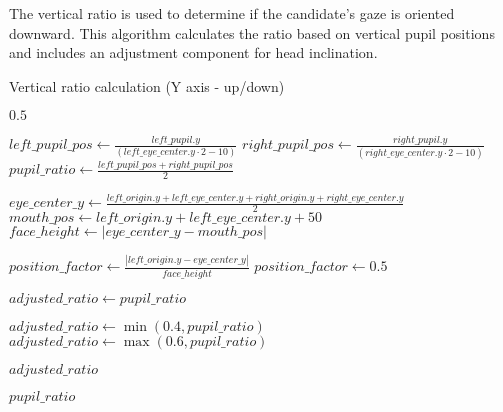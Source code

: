 \documentclass[12pt,a4paper]{article}
\begin{document}
The vertical ratio is used to determine if the candidate's gaze is oriented downward. This algorithm calculates the ratio based on vertical pupil positions and includes an adjustment component for head inclination.

\begin{algorithm}[H]
    \caption{Vertical ratio calculation (Y axis - up/down)}
    \begin{algorithmic}[1]
            \State \Return $0.5$ 
        \EndIf
    
        \State $left\_pupil\_pos \gets \frac{left\_pupil.y}{(left\_eye\_center.y \cdot 2 - 10)}$ 
        \State $right\_pupil\_pos \gets \frac{right\_pupil.y}{(right\_eye\_center.y \cdot 2 - 10)}$
        \State $pupil\_ratio \gets \frac{left\_pupil\_pos + right\_pupil\_pos}{2}$ 
    
            \State$eye\_center\_y \gets \frac{left\_origin.y + left\_eye\_center.y + right\_origin.y + right\_eye\_center.y}{2}$
            \State$mouth\_pos \gets left\_origin.y + left\_eye\_center.y + 50$ 
            \State$face\_height \gets |eye\_center\_y - mouth\_pos|$ 
    
                \State$position\_factor \gets \frac{|left\_origin.y - eye\_center\_y|}{face\_height}$ 
            \Else
                \State$position\_factor \gets 0.5$ 
            \EndIf
    
            \State$adjusted\_ratio \gets pupil\_ratio$
    
                \State$adjusted\_ratio \gets \min(0.4, pupil\_ratio)$ 
                \State$adjusted\_ratio \gets \max(0.6, pupil\_ratio)$ 
            \EndIf
    
            \State\Return$adjusted\_ratio$
        \EndIf

        \State\Return$pupil\_ratio$ 
    \EndProcedure
    \end{algorithmic}
    \end{algorithm}
    
\end{document}
